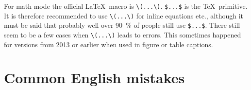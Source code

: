 For math mode the official \LaTeX\ macro is \verb|\(...\)|.
\verb|$...$| is the \TeX\ primitive.
It is therefore recommended to use \verb|\(...\)| for inline equations etc.,
although it must be said that probably well over \SI{90}{\%} of people still use \verb|$...$|.
There still seem to be a few cases when \verb|\(...\)| leads to errors.
This sometimes happened for \TeXLive versions from 2013 or earlier
when used in figure or table captions.


\section{Common English mistakes}%
\label{sec:tips:english}

